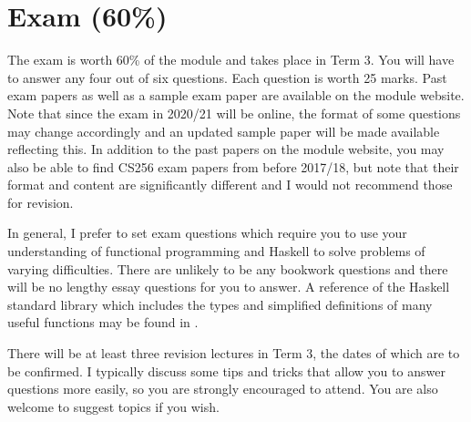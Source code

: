 \section{Exam (60\%)}

The exam is worth 60\% of the module and takes place in Term 3. You will have to answer any four out of six questions. Each question is worth 25 marks. Past exam papers as well as a sample exam paper are available on the module website. Note that since the exam in 2020/21 will be online, the format of some questions may change accordingly and an updated sample paper will be made available reflecting this. In addition to the past papers on the module website, you may also be able to find CS256 exam papers from before 2017/18, but note that their format and content are significantly different and I would not recommend those for revision.

In general, I prefer to set exam questions which require you to use your understanding of functional programming and Haskell to solve problems of varying difficulties. There are unlikely to be any bookwork questions and there will be no lengthy essay questions for you to answer. %
A reference of the Haskell standard library which includes the types and simplified definitions of many useful functions may be found in . %

There will be at least three revision lectures in Term 3, the dates of which are to be confirmed. I typically discuss some tips and tricks that allow you to answer questions more easily, so you are strongly encouraged to attend. You are also welcome to suggest topics if you wish.